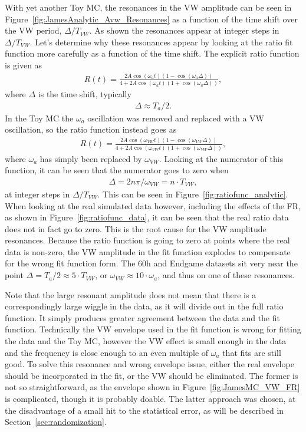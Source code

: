 \documentclass[12pt,letterpaper]{article}
\newcommand{\figref}[1]{Figure~\ref{#1}}
\def\wa{$\omega_{a}$\xspace}
\begin{document}
With yet another Toy MC, the resonances in the VW amplitude can be seen in \figref{fig:JamesAnalytic_Avw_Resonances} as a function of the time shift over the VW period, $\Delta/T_{VW}$. As shown the resonances appear at integer steps in $\Delta/T_{VW}$. Let's determine why these resonances appear by looking at the ratio fit function more carefully as a function of the time shift. The explicit ratio function is given as \cite{60hReport}
    \begin{align}
        R(t) = \frac{2 A \cos(\omega_{a}t) (1 - \cos{(\omega_{a}\Delta)})} {4 + 2A \cos(\omega_{a}t) (1 + \cos{(\omega_{a}\Delta)} )},
    \end{align}
where $\Delta$ is the time shift, typically 
    \begin{align}
        \Delta \approx T_{a}/2.
    \end{align}
In the Toy MC the \wa oscillation was removed and replaced with a VW oscillation, so the ratio function instead goes as 
    \begin{align}
        R(t) = \frac{2 A \cos(\omega_{VW}t) (1 - \cos{(\omega_{VW}\Delta)})} {4 + 2A \cos(\omega_{VW}t) (1 + \cos{(\omega_{VW}\Delta)} )},
    \end{align}
where \wa has simply been replaced by $\omega_{VW}$. Looking at the numerator of this function, it can be seen that the numerator goes to zero when 
    \begin{align}
        \Delta = 2n\pi/\omega_{VW} = n \cdot T_{VW},
    \end{align}
at integer steps in $\Delta/T_{VW}$. This can be seen in \figref{fig:ratiofunc_analytic}. When looking at the real simulated data however, including the effects of the FR, as shown in \figref{fig:ratiofunc_data}, it can be seen that the real ratio data does not in fact go to zero. This is the root cause for the VW amplitude resonances. Because the ratio function is going to zero at points where the real data is non-zero, the VW amplitude in the fit function explodes to compensate for the wrong fit function form. The 60h and Endgame datasets sit very near the point $\Delta = T_{a}/2 \approx 5 \cdot T_{VW}$, or $\omega_{VW} \approx 10 \cdot \omega_{a}$, and thus on one of these resonances.

Note that the large resonant amplitude does not mean that there is a correspondingly large wiggle in the data, as it will divide out in the full ratio function. It simply produces greater agreement between the data and the fit function. Technically the VW envelope used in the fit function is wrong for fitting the data and the Toy MC, however the VW effect is small enough in the data and the frequency is close enough to an even multiple of \wa that fits are still good. To solve this resonance and wrong envelope issue, either the real envelope should be incorporated in the fit, or the VW should be eliminated. The former is not so straightforward, as the envelope shown in \figref{fig:JamesMC_VW_FR} is complicated, though it is probably doable. The latter approach was chosen, at the disadvantage of a small hit to the statistical error, as will be described in Section~\ref{sec:randomization}.
\end{document}
